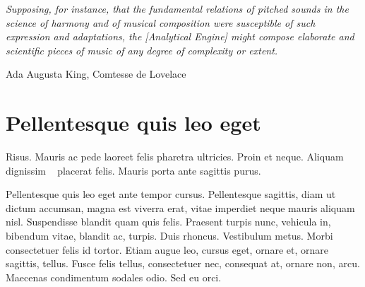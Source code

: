\documentclass[../hdr.tex]{subfiles}
\begin{document}
\label{chap:part1-intro}

  \epigraph{\itshape 
    Supposing, for instance, that the fundamental relations of pitched sounds in
    the science of harmony and of musical composition were susceptible of such
    expression and adaptations, the [Analytical Engine] might compose elaborate
    and scientific pieces of music of any degree of complexity or extent.
  }{Ada Augusta King, Comtesse de Lovelace\footnotemark[1]}
\addtocounter{footnote}{1}

\ifSubfilesClassLoaded{%
  \vskip-1.8cm
  \renewcommand{\contentsname}{}
  \setcounter{secnumdepth}{2}
  \setcounter{tocdepth}{2}
  \tableofcontents
  \begin{center}
  \par\noindent\rule{.4\textwidth}{0.4pt}
  \end{center}
  \vskip-1cm
}{%
  \minitoc
}
\vskip2cm

\section{Pellentesque quis leo eget}

Risus. Mauris ac pede laoreet felis pharetra ultricies. Proin et neque. Aliquam
dignissim \footnotemark~\cite{serra2013roadmap} placerat felis. Mauris porta ante sagittis purus.

Pellentesque quis leo eget ante tempor cursus. Pellentesque sagittis, diam ut
dictum accumsan, magna est viverra erat, vitae imperdiet neque mauris aliquam
nisl. Suspendisse blandit quam quis felis. Praesent turpis nunc, vehicula in,
bibendum vitae, blandit ac, turpis. Duis rhoncus. Vestibulum metus. Morbi
consectetuer felis id tortor. Etiam augue leo, cursus eget, ornare et, ornare
sagittis, tellus. Fusce felis tellus, consectetuer nec, consequat at, ornare
non, arcu. Maecenas condimentum sodales odio. Sed eu orci.
\end{document}
